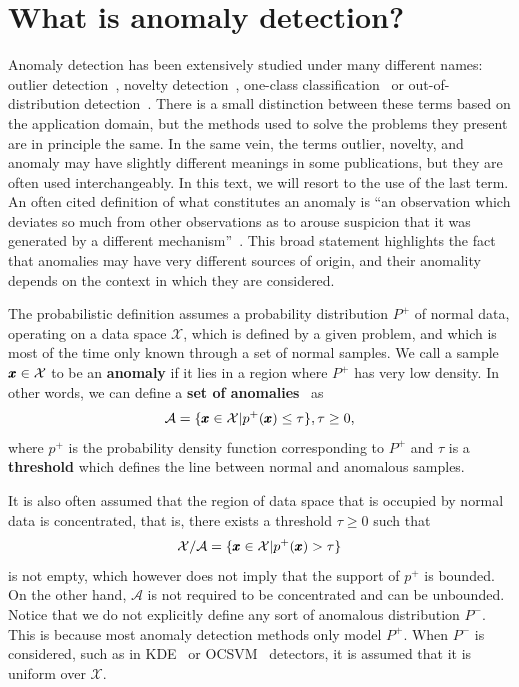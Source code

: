 \section{What is anomaly detection?} \label{sec:ad_definition}
Anomaly detection has been extensively studied under many different names: outlier detection~\cite{knorr98algorithms,hodge2004survey}, novelty detection~\cite{pimentel2014review}, one-class classification~\cite{ruff2018deep} or out-of-distribution detection~\cite{liang2017enhancing}. There is a small distinction between these terms based on the application domain, but the methods used to solve the problems they present are in principle the same. In the same vein, the terms outlier, novelty, and anomaly may have slightly different meanings in some publications, but they are often used interchangeably. In this text, we will resort to the use of the last term. An often cited definition of what constitutes an anomaly is ``an observation which deviates so much from other observations as to arouse suspicion that it was generated by a different mechanism''~\cite{barnett1974outliers}. This broad statement highlights the fact that anomalies may have very different sources of origin, and their anomality depends on the context in which they are considered. 

The probabilistic definition assumes a probability distribution $P^+$ of normal data, operating on a data space $\mathcal{X}$, which is defined by a given problem, and which is most of the time only known through a set of normal samples. We call a sample $\pmb{{x}} \in \mathcal{X}$ to be an \textbf{anomaly} if it lies in a region where $P^+$ has very low density. In other words, we can define a \textbf{set of anomalies}~\cite{ruff2020unifying} as 
\begin{equation} \label{eq:anomaly_set}
    \mathcal{A} = \lbrace \pmb{{x}} \in \mathcal{X} \vert p^+(\pmb{{x}}) \leq \tau \rbrace, \tau \geq 0,
\end{equation}
where $p^+$ is the probability density function corresponding to $P^+$ and $\tau$ is a \textbf{threshold} which defines the line between normal and anomalous samples. 

It is also often assumed that the region of data space that is occupied by normal data is concentrated, that is, there exists a threshold $\tau \geq 0$ such that
\begin{equation} \label{eq:normal_concentration}
    \mathcal{X} \slash \mathcal{A} = \lbrace \pmb{{x}} \in \mathcal{X} \vert p^+(\pmb{{x}}) > \tau \rbrace
\end{equation}
is not empty, which however does not imply that the support of $p^+$ is bounded. On the other hand, $\mathcal{A}$ is not required to be concentrated and can be unbounded. Notice that we do not explicitly define any sort of anomalous distribution $P^-$. This is because most anomaly detection methods only model $P^+$. When $P^-$ is considered, such as in KDE~\cite{parzen1962estimation} or OCSVM~\cite{scholkopf2001estimating} detectors, it is assumed that it is uniform over $\mathcal{X}$. 

